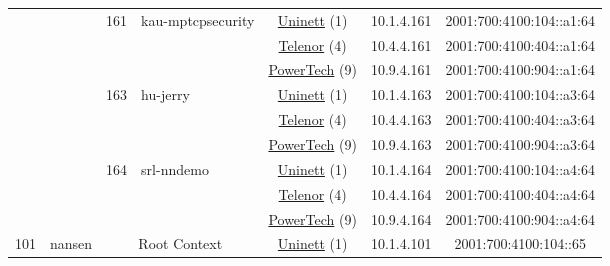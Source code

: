 \begin{small}
\begin{center}
\begin{longtable}{|c|c|c|c|c|c|c|c|}
  &  & \multirow{3}{*}{\tiny{161}} & \multicolumn{1}{|l|}{\multirow{3}{*}{\tiny{kau-mptcpsecurity}}} & \multicolumn{2}{|c|}{\tiny{\href{https://www.uninett.no}{Uninett} (1)}} & \tiny{10.1.4.161} & \tiny{2001:700:4100:104::a1:64} \\* \cline{5-5}\cline{6-6}\cline{7-7}\cline{8-8}
  &  &  &  & \multicolumn{2}{|c|}{\tiny{\href{https://www.telenor.no}{Telenor} (4)}} & \tiny{10.4.4.161} & \tiny{2001:700:4100:404::a1:64} \\* \cline{5-5}\cline{6-6}\cline{7-7}\cline{8-8}
  &  &  &  & \multicolumn{2}{|c|}{\tiny{\href{http://www.powertech.no}{PowerTech} (9)}} & \tiny{10.9.4.161} & \tiny{2001:700:4100:904::a1:64} \\* \cline{3-3}\cline{4-4}\cline{5-5}\cline{6-6}\cline{7-7}\cline{8-8}
  &  & \multirow{3}{*}{\tiny{163}} & \multicolumn{1}{|l|}{\multirow{3}{*}{\tiny{hu-jerry}}} & \multicolumn{2}{|c|}{\tiny{\href{https://www.uninett.no}{Uninett} (1)}} & \tiny{10.1.4.163} & \tiny{2001:700:4100:104::a3:64} \\* \cline{5-5}\cline{6-6}\cline{7-7}\cline{8-8}
  &  &  &  & \multicolumn{2}{|c|}{\tiny{\href{https://www.telenor.no}{Telenor} (4)}} & \tiny{10.4.4.163} & \tiny{2001:700:4100:404::a3:64} \\* \cline{5-5}\cline{6-6}\cline{7-7}\cline{8-8}
  &  &  &  & \multicolumn{2}{|c|}{\tiny{\href{http://www.powertech.no}{PowerTech} (9)}} & \tiny{10.9.4.163} & \tiny{2001:700:4100:904::a3:64} \\* \cline{3-3}\cline{4-4}\cline{5-5}\cline{6-6}\cline{7-7}\cline{8-8}
  &  & \multirow{3}{*}{\tiny{164}} & \multicolumn{1}{|l|}{\multirow{3}{*}{\tiny{srl-nndemo}}} & \multicolumn{2}{|c|}{\tiny{\href{https://www.uninett.no}{Uninett} (1)}} & \tiny{10.1.4.164} & \tiny{2001:700:4100:104::a4:64} \\* \cline{5-5}\cline{6-6}\cline{7-7}\cline{8-8}
  &  &  &  & \multicolumn{2}{|c|}{\tiny{\href{https://www.telenor.no}{Telenor} (4)}} & \tiny{10.4.4.164} & \tiny{2001:700:4100:404::a4:64} \\* \cline{5-5}\cline{6-6}\cline{7-7}\cline{8-8}
  &  &  &  & \multicolumn{2}{|c|}{\tiny{\href{http://www.powertech.no}{PowerTech} (9)}} & \tiny{10.9.4.164} & \tiny{2001:700:4100:904::a4:64} \\ \hline
 \multirow{27}{*}{\tiny{101}} & \multicolumn{1}{|l|}{\multirow{27}{*}{\tiny{nansen}}} & \multicolumn{2}{|c|}{\multirow{3}{*}{\tiny{Root Context}}} & \multicolumn{2}{|c|}{\tiny{\href{https://www.uninett.no}{Uninett} (1)}} & \tiny{10.1.4.101} & \tiny{2001:700:4100:104::65} \\* \cline{5-5}\cline{6-6}\cline{7-7}\cline{8-8}

\end{longtable}
\end{center}
\end{small}
